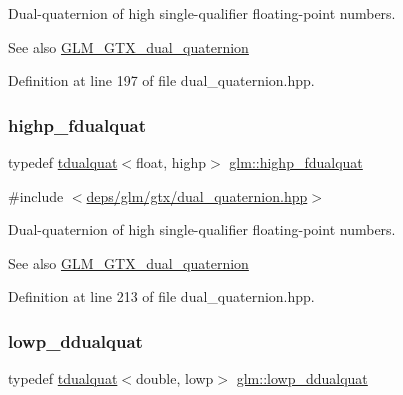 Dual-\/quaternion of high single-\/qualifier floating-\/point numbers.

\begin{DoxySeeAlso}{See also}
\hyperlink{group__gtx__dual__quaternion}{G\+L\+M\+\_\+\+G\+T\+X\+\_\+dual\+\_\+quaternion} 
\end{DoxySeeAlso}


Definition at line 197 of file dual\+\_\+quaternion.\+hpp.

\mbox{\label{group__gtx__dual__quaternion_ga8c46d61c38b2b6d9c5091c667dd20fe8}} 
\subsubsection{\texorpdfstring{highp\+\_\+fdualquat}{highp\_fdualquat}}
{\footnotesize\ttfamily typedef \hyperlink{structglm_1_1tdualquat}{tdualquat}$<$float, highp$>$ \hyperlink{group__gtx__dual__quaternion_ga8c46d61c38b2b6d9c5091c667dd20fe8}{glm\+::highp\+\_\+fdualquat}}



{\ttfamily \#include $<$\hyperlink{dual__quaternion_8hpp}{deps/glm/gtx/dual\+\_\+quaternion.\+hpp}$>$}

Dual-\/quaternion of high single-\/qualifier floating-\/point numbers.

\begin{DoxySeeAlso}{See also}
\hyperlink{group__gtx__dual__quaternion}{G\+L\+M\+\_\+\+G\+T\+X\+\_\+dual\+\_\+quaternion} 
\end{DoxySeeAlso}


Definition at line 213 of file dual\+\_\+quaternion.\+hpp.

\mbox{\label{group__gtx__dual__quaternion_ga361a2ea6cce1446a8ab7e7803156c16c}} 
\subsubsection{\texorpdfstring{lowp\+\_\+ddualquat}{lowp\_ddualquat}}
{\footnotesize\ttfamily typedef \hyperlink{structglm_1_1tdualquat}{tdualquat}$<$double, lowp$>$ \hyperlink{group__gtx__dual__quaternion_ga361a2ea6cce1446a8ab7e7803156c16c}{glm\+::lowp\+\_\+ddualquat}}



